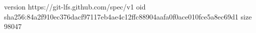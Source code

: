 version https://git-lfs.github.com/spec/v1
oid sha256:84a2f910ec376dacf97117eb4ae4c12ffc88904aafa0f0ace010fce5a8ec69d1
size 98047
